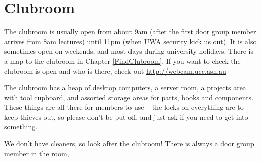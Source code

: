 \chapter{Clubroom}

The clubroom is usually open from about 9am (after the first door group member arrives from 8am lectures) until 11pm (when UWA security kick us out). It is also sometimes open on weekends, and most days during university holidays. There is a map to the clubroom in Chapter \ref{FindClubroom}. If you want to check the clubroom is open and who is there, check out \url{http://webcam.ucc.asn.au}

The clubroom has a heap of desktop computers, a server room, a projects area with tool cupboard, and assorted storage areas for parts, books and components. These things are all there for members to use – the locks on everything are to keep thieves out, so please don't be put off, and just ask if you need to get into something.

We don't have cleaners, so look after the clubroom! There is always a door group member in the room, 
